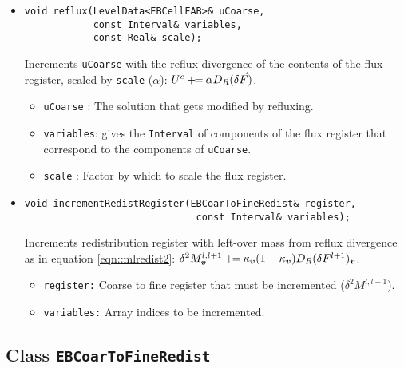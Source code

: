 \begin{itemize}
\item
\begin{small}\begin{verbatim}
void reflux(LevelData<EBCellFAB>& uCoarse,
            const Interval& variables,
            const Real& scale);
\end{verbatim}\end{small}
Increments \verb/uCoarse/ with the reflux divergence of the contents of
the flux register, scaled by \verb/scale/ ($\alpha$):
$U^c \mathbin{+\mkern-7mu=} \alpha D_R(\delta \vec{F})$. 
  \begin{itemize}
  \item
  \verb/uCoarse/ :
The solution that gets modified by refluxing.
  \item
\verb/variables/: gives the \verb/Interval/ of components of
the flux register that correspond to the components
of \verb/uCoarse/.
  \item
  \verb/scale/ :
  Factor by which to scale the flux register.
  \end{itemize}

\item \begin{small}\begin{verbatim}
void incrementRedistRegister(EBCoarToFineRedist& register,
                              const Interval& variables);
\end{verbatim}\end{small}
Increments redistribution register with left-over mass
from reflux divergence as in equation \ref{eqn::mlredist2}:
$\delta^2 M^{l, l+1}_{\boldsymbol{v}} \mathbin{+\mkern-7mu=}
\kappa_{\boldsymbol{v}}(1-\kappa_{\boldsymbol{v}})D_R(\delta F^{l+1})_{\boldsymbol{v}}$.
\begin{itemize}
\item \verb/register:/ Coarse to fine register that must
        be incremented ($\delta^2 M^{l, l+1}$).
\item \verb/variables:/ Array indices to be incremented.
\end{itemize}
\end{itemize}

\subsection{Class {\tt EBCoarToFineRedist}}

